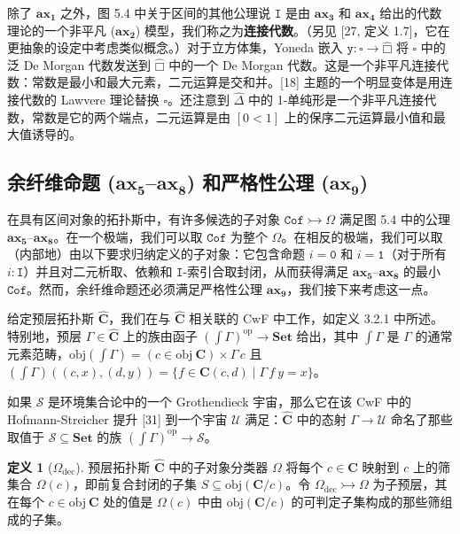 \documentclass{ctexrep}
\theoremstyle{plain}
\theoremstyle{definition}
\newtheorem{definition}[theorem]{定义}
\theoremstyle{remark}
\newcommand\ttI{\mathtt{I}}
\newcommand\hatcube{\widehat{□}}
\newcommand{\ttzero}{\mathtt{0}}
\newcommand{\ttone}{\mathtt{1}}
\newcommand{\ax}[1]{\mathbf{ax_{#1}}}
\begin{document}
除了 $\ax{1}$ 之外，图 5.4 中关于区间的其他公理说 $\ttI$ 是由 $\ax{3}$ 和 $\ax{4}$ 给出的代数理论的一个非平凡 ($\ax{2}$) 模型，我们称之为\textbf{连接代数}。（另见 [27, 定义 1.7]，它在更抽象的设定中考虑类似概念。）对于立方体集，Yoneda 嵌入 $\mathtt{y} : \square \to \hatcube$ 将 $\square$ 中的泛 De Morgan 代数发送到 $\hatcube$ 中的一个 De Morgan 代数。这是一个非平凡连接代数：常数是最小和最大元素，二元运算是交和并。[18] 主题的一个明显变体是用连接代数的 Lawvere 理论替换 $\square$。还注意到 $\widehat{\Delta}$ 中的 1-单纯形是一个非平凡连接代数，常数是它的两个端点，二元运算是由 $[0 < 1]$ 上的保序二元运算最小值和最大值诱导的。

\subsection{余纤维命题 ($\ax{5}$--$\ax{8}$) 和严格性公理 ($\ax{9}$)}

在具有区间对象的拓扑斯中，有许多候选的子对象 $\mathtt{Cof} \rightarrowtail \Omega$ 满足图 5.4 中的公理 $\ax{5}$--$\ax{8}$。在一个极端，我们可以取 $\mathtt{Cof}$ 为整个 $\Omega$。在相反的极端，我们可以取（内部地）由以下要求归纳定义的子对象：它包含命题 $i = \ttzero$ 和 $i = \ttone$（对于所有 $i : \ttI$）并且对二元析取、依赖和 $\ttI$-索引合取封闭，从而获得满足 $\ax{5}$--$\ax{8}$ 的最小 $\mathtt{Cof}$。然而，余纤维命题还必须满足严格性公理 $\ax{9}$，我们接下来考虑这一点。

给定预层拓扑斯 $\widehat{\mathbf{C}}$，我们在与 $\widehat{\mathbf{C}}$ 相关联的 CwF 中工作，如定义 3.2.1 中所述。特别地，预层 $\Gamma \in \widehat{\mathbf{C}}$ 上的族由函子 $(\int \Gamma)^{\mathrm{op}} \to \mathbf{Set}$ 给出，其中 $\int \Gamma$ 是 $\Gamma$ 的通常元素范畴，$\mathrm{obj}(\int \Gamma) = (c \in \mathrm{obj}\ \mathbf{C}) \times \Gamma\,c$ 且 $(\int \Gamma)((c, x), (d, y)) = \{f \in \mathbf{C}(c, d) \mid \Gamma\,f\ y = x\}$。

如果 $\mathcal{S}$ 是环境集合论中的一个 Grothendieck 宇宙，那么它在该 CwF 中的 Hofmann-Streicher 提升 [31] 到一个宇宙 $\mathcal{U}$ 满足：$\widehat{\mathbf{C}}$ 中的态射 $\Gamma \to \mathcal{U}$ 命名了那些取值于 $\mathcal{S}\subseteq\mathbf{Set}$ 的族 $(\int \Gamma)^{\mathrm{op}} \to \mathcal{S}$。

\begin{definition}[$\Omega_{\mathrm{dec}}$]
预层拓扑斯 $\widehat{\mathbf{C}}$ 中的子对象分类器 $\Omega$ 将每个 $c \in \mathbf{C}$ 映射到 $c$ 上的筛集合 $\Omega(c)$，即前复合封闭的子集 $S \subseteq \mathrm{obj}(\mathbf{C}/c)$。令 $\Omega_{\mathrm{dec}} \rightarrowtail \Omega$ 为子预层，其在每个 $c \in \mathrm{obj}\ \mathbf{C}$ 处的值是 $\Omega(c)$ 中由 $\mathrm{obj}(\mathbf{C}/c)$ 的可判定子集构成的那些筛组成的子集。
\end{definition}
\end{document}
